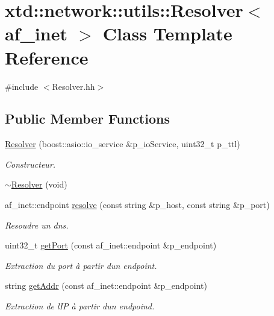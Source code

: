 \hypertarget{classxtd_1_1network_1_1utils_1_1Resolver_3_01af__inet_01_4}{}\section{xtd\+:\+:network\+:\+:utils\+:\+:Resolver$<$ af\+\_\+inet $>$ Class Template Reference}
\label{classxtd_1_1network_1_1utils_1_1Resolver_3_01af__inet_01_4}


{\ttfamily \#include $<$Resolver.\+hh$>$}

\subsection*{Public Member Functions}
\begin{DoxyCompactItemize}
\item 
\hyperlink{classxtd_1_1network_1_1utils_1_1Resolver_3_01af__inet_01_4_a227d9b53586520412dde2ff93e373b65}{Resolver} (boost\+::asio\+::io\+\_\+service \&p\+\_\+io\+Service, uint32\+\_\+t p\+\_\+ttl)
\begin{DoxyCompactList}\small\item\em Constructeur. \end{DoxyCompactList}\item 
\hyperlink{classxtd_1_1network_1_1utils_1_1Resolver_3_01af__inet_01_4_a52780e208a95d05c6eeacc4842851162}{$\sim$\+Resolver} (void)
\item 
af\+\_\+inet\+::endpoint \hyperlink{classxtd_1_1network_1_1utils_1_1Resolver_3_01af__inet_01_4_a014b2c1347380dece13b309969ed25c3}{resolve} (const string \&p\+\_\+host, const string \&p\+\_\+port)
\begin{DoxyCompactList}\small\item\em Resoudre un dns. \end{DoxyCompactList}\item 
uint32\+\_\+t \hyperlink{classxtd_1_1network_1_1utils_1_1Resolver_3_01af__inet_01_4_ac98e2d8aec992068faa974ccca220e4c}{get\+Port} (const af\+\_\+inet\+::endpoint \&p\+\_\+endpoint)
\begin{DoxyCompactList}\small\item\em Extraction du port à partir d\textquotesingle{}un endpoint. \end{DoxyCompactList}\item 
string \hyperlink{classxtd_1_1network_1_1utils_1_1Resolver_3_01af__inet_01_4_a32b299d5a15042feea05622ee3df0d4c}{get\+Addr} (const af\+\_\+inet\+::endpoint \&p\+\_\+endpoint)
\begin{DoxyCompactList}\small\item\em Extraction de l\textquotesingle{}IP à partir d\textquotesingle{}un endpoind. \end{DoxyCompactList}\end{DoxyCompactItemize}


